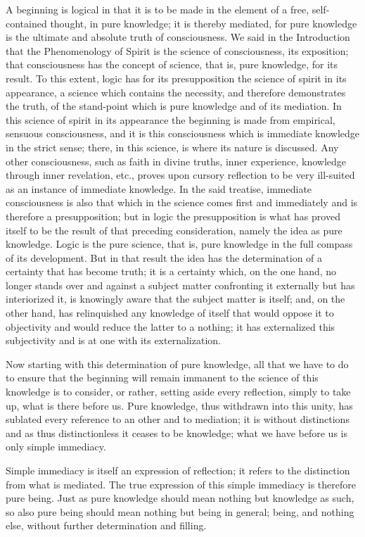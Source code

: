 A beginning is logical in that it is to be made in
the element of a free, self-contained thought, in pure knowledge;
it is thereby mediated, for pure knowledge is
the ultimate and absolute truth of consciousness.
We said in the Introduction that the Phenomenology of Spirit is
the science of consciousness, its exposition;
that consciousness has the concept of science,
that is, pure knowledge, for its result.
To this extent, logic has for its presupposition
the science of spirit in its appearance,
a science which contains the necessity,
and therefore demonstrates the truth,
of the stand-point which is pure knowledge
and of its mediation.
In this science of spirit in its appearance
the beginning is made from empirical, sensuous consciousness,
and it is this consciousness which is
immediate knowledge in the strict sense;
there, in this science, is where its nature is discussed.
Any other consciousness, such as faith in divine truths,
inner experience, knowledge through inner revelation, etc.,
proves upon cursory reflection to be very ill-suited
as an instance of immediate knowledge.
In the said treatise, immediate consciousness is also
that which in the science comes first and immediately
and is therefore a presupposition;
but in logic the presupposition is
what has proved itself to be the result
of that preceding consideration,
namely the idea as pure knowledge.
Logic is the pure science, that is,
pure knowledge in the full compass of its development.
But in that result the idea has the determination of
a certainty that has become truth;
it is a certainty which, on the one hand, no longer stands
over and against a subject matter confronting it externally
but has interiorized it, is knowingly aware
that the subject matter is itself;
and, on the other hand, has relinquished
any knowledge of itself that would oppose it to objectivity
and would reduce the latter to a nothing;
it has externalized this subjectivity
and is at one with its externalization.

Now starting with this determination of pure knowledge,
all that we have to do to ensure that the beginning will remain
immanent to the science of this knowledge is to consider,
or rather, setting aside every reflection,
simply to take up, what is there before us.
Pure knowledge, thus withdrawn into this unity,
has sublated every reference to an other and to mediation;
it is without distinctions and as thus distinctionless
it ceases to be knowledge;
what we have before us is only simple immediacy.

Simple immediacy is itself an expression of reflection;
it refers to the distinction from what is mediated.
The true expression of this simple immediacy is therefore pure being.
Just as pure knowledge should mean nothing but knowledge as such,
so also pure being should mean nothing but being in general;
being, and nothing else, without further determination and filling.

